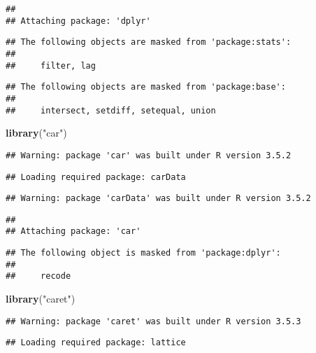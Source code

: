 \documentclass[]{article}
\newenvironment{Shaded}{\begin{snugshade}}{\end{snugshade}}
\newcommand{\KeywordTok}[1]{\textcolor[rgb]{0.13,0.29,0.53}{\textbf{#1}}}
\newcommand{\StringTok}[1]{\textcolor[rgb]{0.31,0.60,0.02}{#1}}
\newcommand{\NormalTok}[1]{#1}
\begin{document}
\begin{verbatim}
## 
## Attaching package: 'dplyr'
\end{verbatim}

\begin{verbatim}
## The following objects are masked from 'package:stats':
## 
##     filter, lag
\end{verbatim}

\begin{verbatim}
## The following objects are masked from 'package:base':
## 
##     intersect, setdiff, setequal, union
\end{verbatim}

\begin{Shaded}
\begin{Highlighting}[]
\KeywordTok{library}\NormalTok{(}\StringTok{"car"}\NormalTok{)}
\end{Highlighting}
\end{Shaded}

\begin{verbatim}
## Warning: package 'car' was built under R version 3.5.2
\end{verbatim}

\begin{verbatim}
## Loading required package: carData
\end{verbatim}

\begin{verbatim}
## Warning: package 'carData' was built under R version 3.5.2
\end{verbatim}

\begin{verbatim}
## 
## Attaching package: 'car'
\end{verbatim}

\begin{verbatim}
## The following object is masked from 'package:dplyr':
## 
##     recode
\end{verbatim}

\begin{Shaded}
\begin{Highlighting}[]
\KeywordTok{library}\NormalTok{(}\StringTok{"caret"}\NormalTok{)}
\end{Highlighting}
\end{Shaded}

\begin{verbatim}
## Warning: package 'caret' was built under R version 3.5.3
\end{verbatim}

\begin{verbatim}
## Loading required package: lattice
\end{verbatim}
\end{document}
